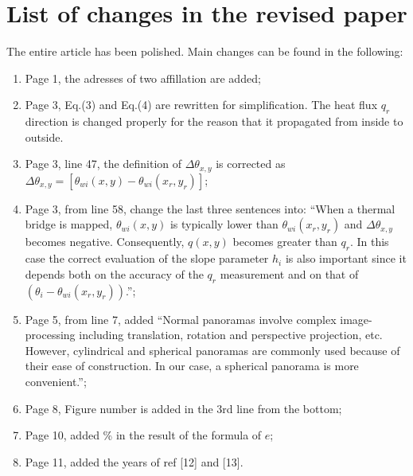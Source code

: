 \documentclass{article}
\begin{document}
\section{List of changes in the revised paper} %
The entire article has been polished. Main changes can be found in the following:
\begin{enumerate}
    \item Page 1, the adresses of two affillation are added; 
    \item Page 3, Eq.(3) and Eq.(4) are rewritten for simplification. The heat flux $q_r$ direction is changed properly for the reason that it propagated from inside to outside.
    \item Page 3, line 47, the definition of $\Delta \theta_{x,y}$ is corrected as $\Delta \theta_{x,y}=[\theta_{wi} (x,y)- \theta_{wi} (x_r,y_r)] $; 
    \item Page 3, from line 58, change the last three sentences into: ``When a thermal bridge is mapped, $\theta_{wi} (x,y)$ is typically lower than $\theta_{wi} (x_r,y_r)$ and $\Delta \theta_{x,y}$ becomes negative. Consequently, $q(x,y)$ becomes greater than $q_r$. In this case the correct evaluation of the slope parameter $h_i$ is also important since it depends both on the accuracy of the $q_r$ measurement and on that of $(\theta_i - \theta_{wi}(x_r,y_r))$.'';
    \item Page 5, from line 7, added ``Normal panoramas involve complex image-processing including translation, rotation and perspective projection, etc. However, cylindrical and spherical panoramas are commonly used because of their ease of construction. In our case, a spherical panorama is more convenient.”;
    \item Page 8, Figure number is added in the 3rd line from the bottom;
    \item Page 10, added \% in the result of the formula of $e$;
    \item Page 11, added the years of ref [12] and [13].
\end{enumerate}
\end{document}
